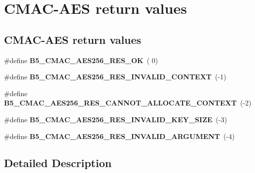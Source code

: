 \hypertarget{group__cmacaes_return}{\section{C\-M\-A\-C-\/\-A\-E\-S return values}
\label{group__cmacaes_return}
}
\subsection*{C\-M\-A\-C-\/\-A\-E\-S return values}
\begin{DoxyCompactItemize}
\item 
\hypertarget{group__cmacaes_return_gadafde446f7d5fa67296a58dad6cd6a35}{\#define {\bfseries B5\-\_\-\-C\-M\-A\-C\-\_\-\-A\-E\-S256\-\_\-\-R\-E\-S\-\_\-\-O\-K}~( 0)}\label{group__cmacaes_return_gadafde446f7d5fa67296a58dad6cd6a35}

\item 
\hypertarget{group__cmacaes_return_gad6f08cefa72adebe0920043e05f718ec}{\#define {\bfseries B5\-\_\-\-C\-M\-A\-C\-\_\-\-A\-E\-S256\-\_\-\-R\-E\-S\-\_\-\-I\-N\-V\-A\-L\-I\-D\-\_\-\-C\-O\-N\-T\-E\-X\-T}~(-\/1)}\label{group__cmacaes_return_gad6f08cefa72adebe0920043e05f718ec}

\item 
\hypertarget{group__cmacaes_return_ga75e806521316e70770944327fdc3d50e}{\#define {\bfseries B5\-\_\-\-C\-M\-A\-C\-\_\-\-A\-E\-S256\-\_\-\-R\-E\-S\-\_\-\-C\-A\-N\-N\-O\-T\-\_\-\-A\-L\-L\-O\-C\-A\-T\-E\-\_\-\-C\-O\-N\-T\-E\-X\-T}~(-\/2)}\label{group__cmacaes_return_ga75e806521316e70770944327fdc3d50e}

\item 
\hypertarget{group__cmacaes_return_gaea8254d60c26aa10faea0046a204d3bd}{\#define {\bfseries B5\-\_\-\-C\-M\-A\-C\-\_\-\-A\-E\-S256\-\_\-\-R\-E\-S\-\_\-\-I\-N\-V\-A\-L\-I\-D\-\_\-\-K\-E\-Y\-\_\-\-S\-I\-Z\-E}~(-\/3)}\label{group__cmacaes_return_gaea8254d60c26aa10faea0046a204d3bd}

\item 
\hypertarget{group__cmacaes_return_ga81b2a672e055c4b0ef629b45257f8590}{\#define {\bfseries B5\-\_\-\-C\-M\-A\-C\-\_\-\-A\-E\-S256\-\_\-\-R\-E\-S\-\_\-\-I\-N\-V\-A\-L\-I\-D\-\_\-\-A\-R\-G\-U\-M\-E\-N\-T}~(-\/4)}\label{group__cmacaes_return_ga81b2a672e055c4b0ef629b45257f8590}

\end{DoxyCompactItemize}


\subsection{Detailed Description}
